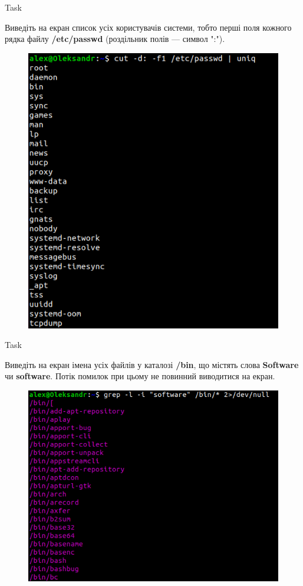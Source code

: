\documentclass[a4paper,12pt]{article}
\newcommand{\RomanNumeralCaps}[1]{\MakeUppercase{\romannumeral #1}}
\begin{document}
    \begin{center}
        \Large{Task \RomanNumeralCaps{11}}
    \end{center}
    Виведіть на екран список усіх користувачів системи, тобто перші поля кожного рядка файлу \textbf{/etc/passwd} (роздільник полів — символ ":").
    \begin{figure}[h!]
        \begin{minipage}[h]{1\linewidth}
            \centering
            \includegraphics[width=0.5\linewidth]{Prt sc/Figure_11.png}  
        \end{minipage}
    \end{figure}

\newpage
    \begin{center}
        \Large{Task \RomanNumeralCaps{12}}
    \end{center}
    Виведіть на екран імена усіх файлів у каталозі \textbf{/bin}, що містять слова \textbf{Software} чи \textbf{software}.
    Потік помилок при цьому не повинний виводитися на екран.
    \begin{figure}[h!]
        \begin{minipage}[h]{1\linewidth}
            \centering
            \includegraphics[width=0.5\linewidth]{Prt sc/Figure_12.png}  
        \end{minipage}
    \end{figure}
\end{document}
